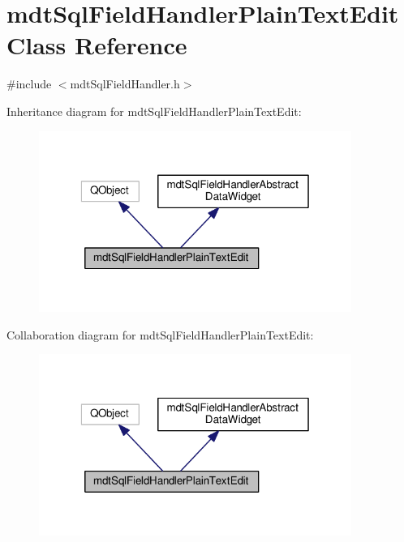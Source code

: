 \hypertarget{classmdt_sql_field_handler_plain_text_edit}{\section{mdt\-Sql\-Field\-Handler\-Plain\-Text\-Edit Class Reference}
\label{classmdt_sql_field_handler_plain_text_edit}
}


{\ttfamily \#include $<$mdt\-Sql\-Field\-Handler.\-h$>$}



Inheritance diagram for mdt\-Sql\-Field\-Handler\-Plain\-Text\-Edit\-:
\nopagebreak
\begin{figure}[H]
\begin{center}
\leavevmode
\includegraphics[width=289pt]{classmdt_sql_field_handler_plain_text_edit__inherit__graph}
\end{center}
\end{figure}


Collaboration diagram for mdt\-Sql\-Field\-Handler\-Plain\-Text\-Edit\-:
\nopagebreak
\begin{figure}[H]
\begin{center}
\leavevmode
\includegraphics[width=289pt]{classmdt_sql_field_handler_plain_text_edit__coll__graph}
\end{center}
\end{figure}
